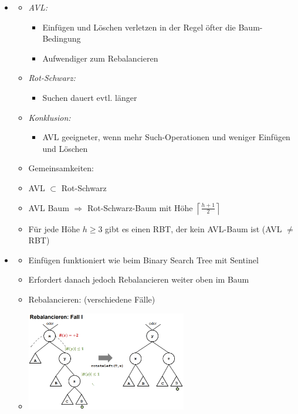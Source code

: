 \documentclass[
    12pt,
    a4paper,
    ngerman,
    color=3b,%
    marginpar=false,
    colorback=false,
    leqno,
]{tudaexercise}
\begin{document}
\begin{itemize}
        \item {}
            \begin{itemize}
                \item \textit{AVL:}
                    \begin{itemize}
                        \item Einfügen und Löschen verletzen in der Regel öfter die Baum-Bedingung
                        \item Aufwendiger zum Rebalancieren
                    \end{itemize}
                \item \textit{Rot-Schwarz:}
                    \begin{itemize}
                        \item Suchen dauert evtl. länger
                    \end{itemize}
                \item \textit{Konklusion:}
                    \begin{itemize}
                        \item AVL geeigneter, wenn mehr Such-Operationen und weniger Einfügen und Löschen
                    \end{itemize}
                \item Gemeinsamkeiten:
                    \item AVL $\subset$ Rot-Schwarz
                    \item AVL Baum $\Rightarrow$ Rot-Schwarz-Baum mit Höhe $\left \lceil \frac{h+1}{2} \right \rceil$
                    \item Für jede Höhe $h \geq 3$ gibt es einen RBT, der kein AVL-Baum ist (AVL $\neq$ RBT)
            \end{itemize}
\clearpage
        \item {}
            \begin{itemize}
                \item Einfügen funktioniert wie beim Binary Search Tree mit Sentinel
                \item Erfordert danach jedoch Rebalancieren weiter oben im Baum
                \item Rebalancieren: (verschiedene Fälle)
                \item[]
                    \begin{minipage}{0.45\textwidth}
                        \includegraphics[width=7cm]{pictures/avlcase1.PNG}

\end{minipage}
\end{itemize}
\end{itemize}
\end{document}
